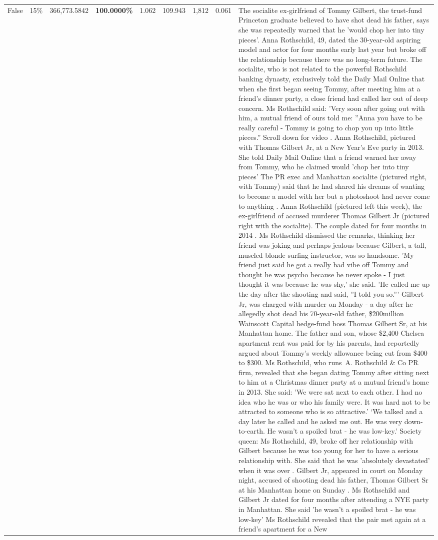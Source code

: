 \begin{table}[H]
\begin{tabular}{lllrlllll}
False & 15\% & 366,773.5842 & \bfseries \color{red} 100.0000\% & 1.062 & 109.943 & 1,812 & 0.061 & The socialite ex-girlfriend of Tommy Gilbert, the trust-fund Princeton graduate believed to have shot dead his father, says she was repeatedly warned that he 'would chop her into tiny pieces'. Anna Rothschild, 49, dated the 30-year-old aspiring model and actor for four months early last year but broke off the relationship because there was no long-term future. The socialite, who is not related to the powerful Rothschild banking dynasty, exclusively told the Daily Mail Online that when she first began seeing Tommy, after meeting him at a friend's dinner party, a close friend had called her out of deep concern. Ms Rothschild said: 'Very soon after going out with him, a mutual friend of ours told me: ''Anna you have to be really careful - Tommy is going to chop you up into little pieces.'' Scroll down for video . Anna Rothschild, pictured with Thomas Gilbert Jr, at a New Year's Eve party in 2013. She told Daily Mail Online that a friend warned her away from Tommy, who he claimed would 'chop her into tiny pieces' The PR exec and Manhattan socialite (pictured right, with Tommy) said that he had shared his dreams of wanting to become a model with her but a photoshoot had never come to anything . Anna Rothschild (pictured left this week), the ex-girlfriend of accused murderer Thomas Gilbert Jr (pictured right with the socialite). The couple dated for four months in 2014 . Ms Rothschild dismissed the remarks, thinking her friend was joking and perhaps jealous because Gilbert, a tall, muscled blonde surfing instructor, was so handsome. 'My friend just said he got a really bad vibe off Tommy and thought he was psycho because he never spoke - I just thought it was because he was shy,' she said. 'He called me up the day after the shooting and said, ''I told you so.''' Gilbert Jr, was charged with murder on Monday - a day after he allegedly shot dead his 70-year-old father, \$200million Wainscott Capital hedge-fund boss Thomas Gilbert Sr, at his Manhattan home. The father and son, whose \$2,400 Chelsea apartment rent was paid for by his parents, had reportedly argued about Tommy's weekly allowance being cut from \$400 to \$300. Ms Rothschild, who runs A. Rothschild \& Co PR firm, revealed that she began dating Tommy after sitting next to him at a Christmas dinner party at a mutual friend's home in 2013. She said: 'We were sat next to each other. I had no idea who he was or who his family were. It was hard not to be attracted to someone who is so attractive.' ‘We talked and a day later he called and he asked me out. He was very down-to-earth. He wasn’t a spoiled brat - he was low-key.’ Society queen: Ms Rothschild, 49, broke off her relationship with Gilbert because he was too young for her to have a serious relationship with. She said that he was 'absolutely devastated' when it was over . Gilbert Jr, appeared in court on Monday night, accused of shooting dead his father, Thomas Gilbert Sr at his Manhattan home on Sunday . Ms Rothschild and Gilbert Jr dated for four months after attending a NYE party in Manhattan. She said 'he wasn't a spoiled brat - he was low-key' Ms Rothschild revealed that the pair met again at a friend’s apartment for a New 
\end{tabular}
\end{table}
